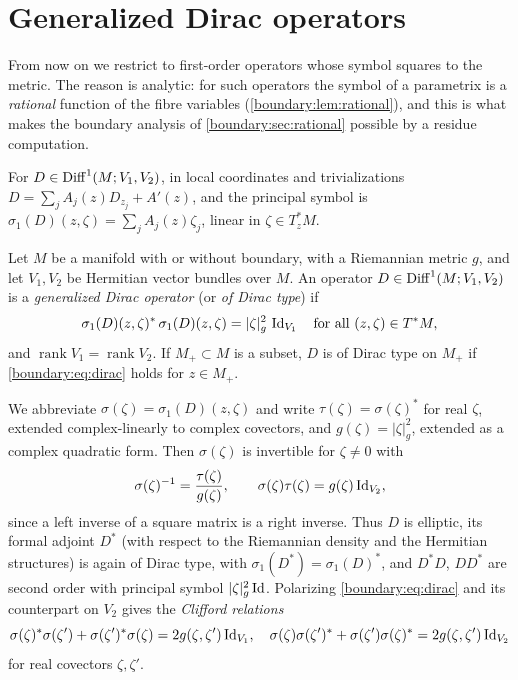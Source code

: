 \section{Generalized Dirac operators}\label{boundary:sec:dirac}

From now on we restrict to first-order operators whose symbol squares to the metric.
The reason is analytic: for such operators the symbol of a parametrix is a
\emph{rational} function of the fibre variables (\cref{boundary:lem:rational}), and
this is what makes the boundary analysis of \cref{boundary:sec:rational} possible by
a residue computation.

For $D\in\operatorname{Diff}^{1}(M;V_1,V_2)$, in local coordinates and trivializations
$D=\sum_jA_j(z)D_{z_j}+A'(z)$, and the principal symbol is
$\sigma_1(D)(z,\zeta)=\sum_jA_j(z)\zeta_j$, linear in $\zeta\in T^*_zM$.

\begin{definition}\label{boundary:def:dirac}
Let $M$ be a manifold with or without boundary, with a Riemannian metric $g$, and let
$V_1,V_2$ be Hermitian vector bundles over $M$. An operator $D\in\operatorname{Diff}^{1}(M;V_1,V_2)$
is a \emph{generalized Dirac operator} (or \emph{of Dirac type}) if
\begin{equation}\label{boundary:eq:dirac}
\sigma_1(D)(z,\zeta)^*\,\sigma_1(D)(z,\zeta)=|\zeta|_g^2\,\operatorname{Id}_{V_1}\quad\text{for all}
\ (z,\zeta)\in T^*M,
\end{equation}
and $\operatorname{rank}V_1=\operatorname{rank}V_2$. If $M_+\subset M$ is a subset,
$D$ is of Dirac type on $M_+$ if \eqref{boundary:eq:dirac} holds for $z\in M_+$.
\end{definition}

We abbreviate $\sigma(\zeta)=\sigma_1(D)(z,\zeta)$ and write $\tau(\zeta)=
\sigma(\zeta)^*$ for real $\zeta$, extended complex-linearly to complex covectors, and
$g(\zeta)=|\zeta|^2_g$, extended as a complex quadratic form. Then $\sigma(\zeta)$ is
invertible for $\zeta\ne0$ with
\begin{equation*}
\sigma(\zeta)^{-1}=\frac{\tau(\zeta)}{g(\zeta)},\qquad \sigma(\zeta)\tau(\zeta)=
g(\zeta)\operatorname{Id}_{V_2},
\end{equation*}
since a left inverse of a square matrix is a right inverse. Thus $D$ is elliptic, its
formal adjoint $D^*$ (with respect to the Riemannian density and the Hermitian
structures) is again of Dirac type, with $\sigma_1(D^*)=\sigma_1(D)^*$, and $D^*D$,
$DD^*$ are second order with principal symbol $|\zeta|^2_g\operatorname{Id}$. Polarizing
\eqref{boundary:eq:dirac} and its counterpart on $V_2$ gives the \emph{Clifford
relations}
\begin{equation}\label{boundary:eq:clifford}
\sigma(\zeta)^*\sigma(\zeta')+\sigma(\zeta')^*\sigma(\zeta)=2g(\zeta,\zeta')\operatorname{Id}_{V_1},\quad
\sigma(\zeta)\sigma(\zeta')^*+\sigma(\zeta')\sigma(\zeta)^*=2g(\zeta,\zeta')\operatorname{Id}_{V_2}
\end{equation}
for real covectors $\zeta,\zeta'$.

